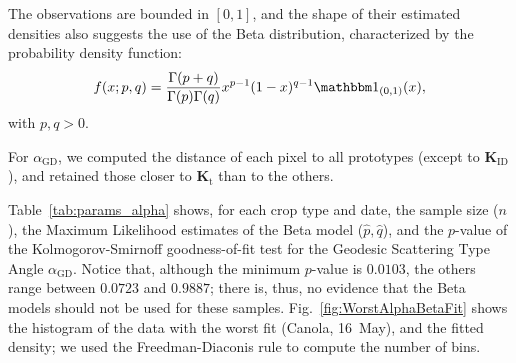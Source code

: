 \documentclass[journal]{IEEEtran}
\begin{document}
	The observations are bounded in $[0,1]$, 
	and the shape of their estimated densities also suggests the use of the Beta distribution, characterized by the probability density function:
	\begin{equation}
		f(x; p, q) = \frac{\Gamma(p+q)}{\Gamma(p)\Gamma(q)} x^{p-1} (1-x)^{q-1} \mathbbm 1_{(0,1)}(x),
		\label{eq:BetaDensity}
	\end{equation}
	with $p,q>0$.
	
	For $\alpha_{\text{GD}}$, we computed the distance of each pixel to all prototypes (except to $\bm K_{\text{ID}}$), and retained those closer to $\bm K_{\text{t}}$ than to the others.
	
	Table~\ref{tab:params_alpha} shows, for each crop type and date, 
	the sample size ($n$), 
	the Maximum Likelihood estimates of the Beta model ($\widehat p,\widehat q$), and the $p$-value of the Kolmogorov-Smirnoff goodness-of-fit test for the Geodesic Scattering Type Angle $\alpha_{\text{GD}}$.
	Notice that, although the minimum $p$-value is $0.0103$, the others range between $0.0723$ and $0.9887$; there is, thus, no evidence that the Beta models should not be used for these samples.
	Fig.~\ref{fig:WorstAlphaBetaFit} shows the histogram of the data with the worst fit (Canola, 16~May), and the fitted density; we used the Freedman-Diaconis rule to compute the number of bins.
	
\end{document}
